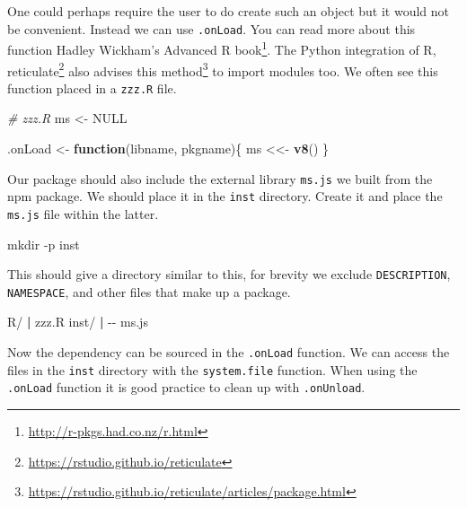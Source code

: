 \documentclass[
]{krantz}
\makeatletter
\newenvironment{Shaded}{\begin{snugshade}}{\end{snugshade}}
\newcommand{\CommentTok}[1]{\textcolor[rgb]{0.37,0.37,0.37}{\textit{#1}}}
\newcommand{\ControlFlowTok}[1]{\textcolor[rgb]{0.27,0.27,0.27}{\textbf{#1}}}
\newcommand{\ExtensionTok}[1]{#1}
\newcommand{\FunctionTok}[1]{\textcolor[rgb]{0,0,0}{#1}}
\newcommand{\KeywordTok}[1]{\textcolor[rgb]{0.27,0.27,0.27}{\textbf{#1}}}
\newcommand{\NormalTok}[1]{#1}
\newcommand{\OtherTok}[1]{\textcolor[rgb]{0.37,0.37,0.37}{#1}}
\newcommand{\StringTok}[1]{\textcolor[rgb]{0.5,0.5,0.5}{#1}}
\renewcommand{\href}[2]{#2\footnote{\url{#1}}}
\newenvironment{kframe}{%
\medskip{}
\setlength{\fboxsep}{.8em}
 \def\at@end@of@kframe{}%
 \ifinner\ifhmode%
  \def\at@end@of@kframe{\end{minipage}}%
  \begin{minipage}{\columnwidth}%
 \fi\fi%
 \def\FrameCommand##1{\hskip\@totalleftmargin \hskip-\fboxsep
 \colorbox{shadecolor}{##1}\hskip-\fboxsep
     \hskip-\linewidth \hskip-\@totalleftmargin \hskip\columnwidth}%
 \MakeFramed {\advance\hsize-\width
   \@totalleftmargin\z@ \linewidth\hsize
   \@setminipage}}%
 {\par\unskip\endMakeFramed%
 \at@end@of@kframe}
\renewenvironment{Shaded}{\begin{kframe}}{\end{kframe}}
\makeatother
\begin{document}
One could perhaps require the user to do create such an object but it would not be convenient. Instead we can use \texttt{.onLoad}. You can read more about this function Hadley Wickham's \href{http://r-pkgs.had.co.nz/r.html}{Advanced R book}. The Python integration of R, \href{https://rstudio.github.io/reticulate}{reticulate} \citep{R-reticulate} also advises \href{https://rstudio.github.io/reticulate/articles/package.html}{this method} to import modules too. We often see this function placed in a \texttt{zzz.R} file.

\begin{Shaded}
\begin{Highlighting}[]
\CommentTok{\# zzz.R}
\NormalTok{ms <{-}}\StringTok{ }\OtherTok{NULL}

\NormalTok{.onLoad <{-}}\StringTok{ }\ControlFlowTok{function}\NormalTok{(libname, pkgname)\{}
\NormalTok{  ms <<{-}}\StringTok{ }\KeywordTok{v8}\NormalTok{()}
\NormalTok{\}}
\end{Highlighting}
\end{Shaded}

Our package should also include the external library \texttt{ms.js} we built from the npm package. We should place it in the \texttt{inst} directory. Create it and place the \texttt{ms.js} file within the latter.

\begin{Shaded}
\begin{Highlighting}[]
\FunctionTok{mkdir}\NormalTok{ {-}p inst}
\end{Highlighting}
\end{Shaded}

This should give a directory similar to this, for brevity we exclude \texttt{DESCRIPTION}, \texttt{NAMESPACE}, and other files that make up a package.

\begin{Shaded}
\begin{Highlighting}[]
\ExtensionTok{R/}
\KeywordTok{|} \ExtensionTok{zzz.R}
\ExtensionTok{inst/}
\KeywordTok{|} \ExtensionTok{{-}{-}}\NormalTok{ ms.js}
\end{Highlighting}
\end{Shaded}

Now the dependency can be sourced in the \texttt{.onLoad} function. We can access the files in the \texttt{inst} directory with the \texttt{system.file} function. When using the \texttt{.onLoad} function it is good practice to clean up with \texttt{.onUnload}.
\end{document}
